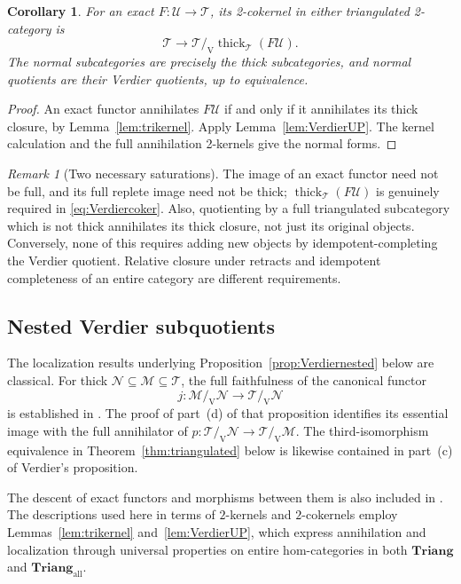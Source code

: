 \documentclass[11pt,reqno,a4paper]{amsart}
\newtheorem{corollary}[theorem]{Corollary}
\theoremstyle{definition}
\theoremstyle{remark}
\newtheorem{remark}[theorem]{Remark}
\newcommand{\M}{\mathcal{M}}
\newcommand{\N}{\mathcal{N}}
\newcommand{\T}{\mathcal{T}}
\newcommand{\U}{\mathcal{U}}
\newcommand{\0}{\mathbf{0}}
\renewcommand{\1}{\mathbf{1}}
\newcommand{\Triang}{\mathbf{Triang}}
\newcommand{\Tri}{\Triang}
\newcommand{\TriAll}{\mathbf{Triang}_{\mathrm{all}}}
\newcommand{\vq}[2]{#1/_{\!\mathrm V}#2}
\DeclareMathOperator{\thick}{thick}
\begin{document}
\begin{corollary}\label{cor:Verdiercoker}
For an exact $F:\U\to\T$, its 2-cokernel in either triangulated
2-category is
\begin{equation}\label{eq:Verdiercoker}
 \T\longrightarrow\vq{\T}{\thick_{\T}(F\U)}.
\end{equation}
The normal subcategories are precisely the thick subcategories, and
normal quotients are their Verdier quotients, up to equivalence.
\end{corollary}
\begin{proof}
An exact functor annihilates $F\U$ if and only if it annihilates its
thick closure, by Lemma~\ref{lem:trikernel}. Apply
Lemma~\ref{lem:VerdierUP}. The kernel calculation and the full
annihilation 2-kernels give the normal forms.
\end{proof}

\begin{remark}[Two necessary saturations]
The image of an exact functor need not be full, and its full replete
image need not be thick;
$\thick_{\T}(F\U)$ is genuinely required in
\eqref{eq:Verdiercoker}. Also, quotienting by a full triangulated
subcategory which is not thick annihilates its thick closure, not just
its original objects. Conversely, none of this requires adding new
objects by idempotent-completing the Verdier quotient. Relative closure
under retracts and idempotent completeness of an entire category are
different requirements.
\end{remark}

\subsection{Nested Verdier subquotients}

The localization results underlying
Proposition~\ref{prop:Verdiernested} below are classical.
For thick $\N\subseteq\M\subseteq\T$, the full faithfulness
of the canonical functor
\[
 j:\vq{\M}{\N}\longrightarrow\vq{\T}{\N}
\]
is established in
\cite[Chap.~II, Proposition~2.3.1(b)]{Verdier}.
The proof of part~(d) of that proposition identifies its
essential image with the full annihilator of
$p:\vq{\T}{\N}\to\vq{\T}{\M}$.
The third-isomorphism equivalence in
Theorem~\ref{thm:triangulated} below is likewise contained in
part~(c) of Verdier's proposition.

The descent of exact functors and morphisms between them
is also included in
\cite[Chap.~II, Corollary~2.2.11(c)]{Verdier}.
The descriptions used here in terms of $2$-kernels and
$2$-cokernels employ Lemmas~\ref{lem:trikernel}
and~\ref{lem:VerdierUP}, which express annihilation and
localization through universal properties on entire
hom-categories in both $\Tri$ and $\TriAll$.
\end{document}
